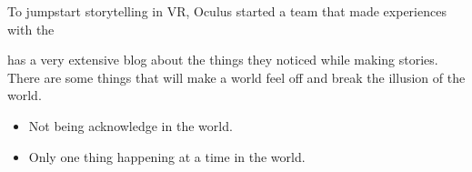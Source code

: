 \documentclass{report}
\begin{document}
				To jumpstart storytelling in VR, Oculus started a team that made experiences with the  
				
				 has a very extensive blog about the things they noticed while making stories. There are some things that will make a world feel off and break the illusion of the world.
				\begin{itemize}
					\item Not being acknowledge in the world.
					\item Only one thing happening at a time in the world.
				\end{itemize}
				
				
		
\end{document}
